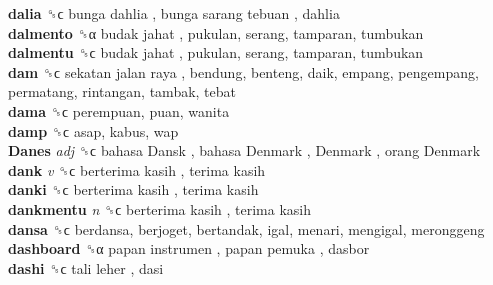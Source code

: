 \textbf{dalia} ␝ϲ   bunga dahlia ,  bunga sarang tebuan , dahlia  \\
\textbf{dalmento} ␝α   budak jahat , pukulan, serang, tamparan, tumbukan  \\
\textbf{dalmentu} ␝ϲ   budak jahat , pukulan, serang, tamparan, tumbukan  \\
\textbf{dam} ␝ϲ   sekatan jalan raya , bendung, benteng, daik, empang, pengempang, permatang, rintangan, tambak, tebat  \\
\textbf{dama} ␝ϲ  perempuan, puan, wanita  \\
\textbf{damp} ␝ϲ  asap, kabus, wap  \\
\textbf{Danes} \emph{adj}  ␝ϲ   bahasa Dansk ,  bahasa Denmark ,  Denmark ,  orang Denmark   \\
\textbf{dank} \emph{v}  ␝ϲ   berterima kasih ,  terima kasih   \\
\textbf{danki} ␝ϲ   berterima kasih ,  terima kasih   \\
\textbf{dankmentu} \emph{n}  ␝ϲ   berterima kasih ,  terima kasih   \\
\textbf{dansa} ␝ϲ  berdansa, berjoget, bertandak, igal, menari, mengigal, meronggeng  \\
\textbf{dashboard} ␝α   papan instrumen ,  papan pemuka , dasbor  \\
\textbf{dashi} ␝ϲ   tali leher , dasi  \\
